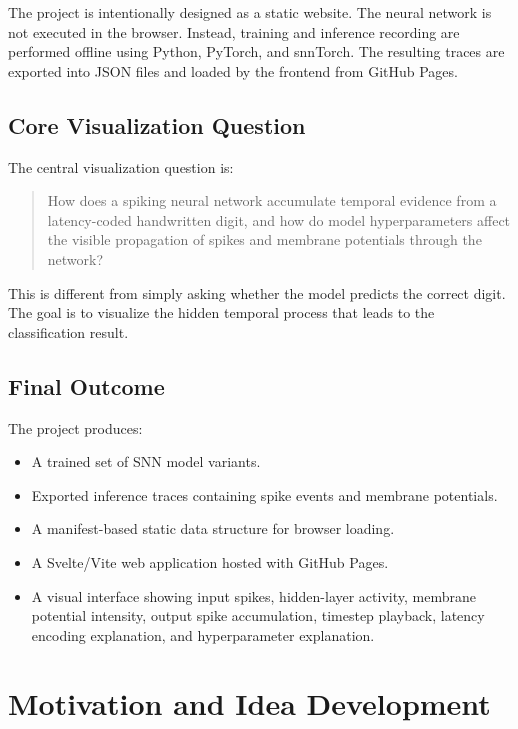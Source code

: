 \documentclass[11pt,a4paper]{article}
\begin{document}
The project is intentionally designed as a static website. The neural network is not executed in the browser. Instead, training and inference recording are performed offline using Python, PyTorch, and snnTorch. The resulting traces are exported into JSON files and loaded by the frontend from GitHub Pages.

\subsection{Core Visualization Question}

The central visualization question is:

\begin{quote}
How does a spiking neural network accumulate temporal evidence from a latency-coded handwritten digit, and how do model hyperparameters affect the visible propagation of spikes and membrane potentials through the network?
\end{quote}

This is different from simply asking whether the model predicts the correct digit. The goal is to visualize the hidden temporal process that leads to the classification result.

\subsection{Final Outcome}

The project produces:

\begin{itemize}
    \item A trained set of SNN model variants.
    \item Exported inference traces containing spike events and membrane potentials.
    \item A manifest-based static data structure for browser loading.
    \item A Svelte/Vite web application hosted with GitHub Pages.
    \item A visual interface showing input spikes, hidden-layer activity, membrane potential intensity, output spike accumulation, timestep playback, latency encoding explanation, and hyperparameter explanation.
\end{itemize}

\section{Motivation and Idea Development}
\end{document}
